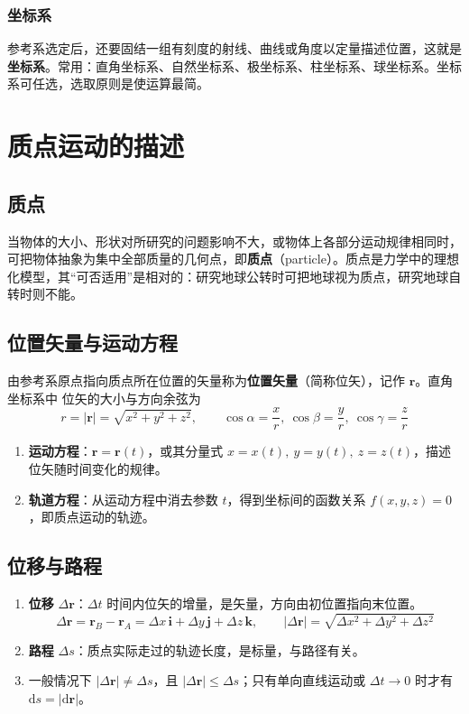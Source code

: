         \subsubsection{坐标系}
        参考系选定后，还要固结一组有刻度的射线、曲线或角度以定量描述位置，这就是\textbf{坐标系}。常用：直角坐标系、自然坐标系、极坐标系、柱坐标系、球坐标系。坐标系可任选，选取原则是使运算最简。

\section{质点运动的描述}
    \subsection{质点}
    当物体的大小、形状对所研究的问题影响不大，或物体上各部分运动规律相同时，可把物体抽象为集中全部质量的几何点，即\textbf{质点}（particle）。质点是力学中的理想化模型，其“可否适用”是相对的：研究地球公转时可把地球视为质点，研究地球自转时则不能。

    \subsection{位置矢量与运动方程}
    由参考系原点指向质点所在位置的矢量称为\textbf{位置矢量}（简称位矢），记作 $\boldsymbol{r}$。直角坐标系中
    位矢的大小与方向余弦为
    \[
    r=|\boldsymbol{r}|=\sqrt{x^{2}+y^{2}+z^{2}},\qquad
    \cos\alpha=\frac{x}{r},\ \cos\beta=\frac{y}{r},\ \cos\gamma=\frac{z}{r}
    \]
    \begin{enumerate}
        \item \textbf{运动方程}：$\boldsymbol{r}=\boldsymbol{r}(t)$，或其分量式 $x=x(t),\ y=y(t),\ z=z(t)$，描述位矢随时间变化的规律。
        \item \textbf{轨道方程}：从运动方程中消去参数 $t$，得到坐标间的函数关系 $f(x,y,z)=0$，即质点运动的轨迹。
    \end{enumerate}

    \subsection{位移与路程}
    \begin{enumerate}
        \item \textbf{位移} $\Delta\boldsymbol{r}$：$\Delta t$ 时间内位矢的增量，是矢量，方向由初位置指向末位置。
        \[
        \Delta\boldsymbol{r}=\boldsymbol{r}_{B}-\boldsymbol{r}_{A}
        =\Delta x\,\boldsymbol{i}+\Delta y\,\boldsymbol{j}+\Delta z\,\boldsymbol{k},
        \qquad |\Delta\boldsymbol{r}|=\sqrt{\Delta x^{2}+\Delta y^{2}+\Delta z^{2}}
        \]
        \item \textbf{路程} $\Delta s$：质点实际走过的轨迹长度，是标量，与路径有关。
        \item 一般情况下 $|\Delta\boldsymbol{r}|\neq\Delta s$，且 $|\Delta\boldsymbol{r}|\leqslant\Delta s$；只有单向直线运动或 $\Delta t\to0$ 时才有 $\mathrm{d}s=|\mathrm{d}\boldsymbol{r}|$。
    \end{enumerate}

